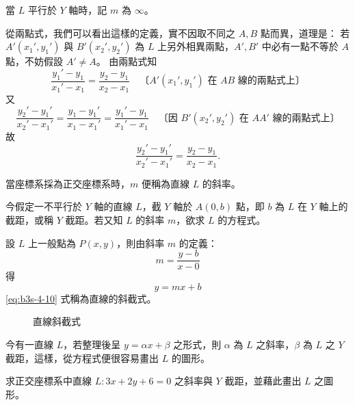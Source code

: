 當 $L$ 平行於 $Y$ 軸時，記 $m$ 為 $\infty$。

從兩點式，我們可以看出這樣的定義，實不因取不同之 $A, B$ 點而異，道理是：
若 $A'(x_1', y_1')$ 與 $B'(x_2', y_2')$ 為 $L$ 上另外相異兩點，$A', B'$ 中必有一點不等於 $A$ 點，不妨假設 $A' \neq A$。
由兩點式知
\[ \frac{y_1' - y_1}{x_1' - x_1} = \frac{y_2 - y_1}{x_2 - x_1} \quad\text{〔$A'(x_1', y_1')$ 在 $AB$ 線的兩點式上〕} \]
又
\[ \frac{y_2' - y_1'}{x_2' - x_1'} = \frac{y_1 - y_1'}{x_1 - x_1'} = \frac{y_1' - y_1}{x_1' - x_1} \quad\text{〔因 $B'(x_2', y_2')$ 在 $AA'$ 線的兩點式上〕} \]
故
\[ \frac{y_2' - y_1'}{x_2' - x_1'} = \frac{y_2 - y_1}{x_2 - x_1}. \]

當座標系採為正交座標系時，$m$ 便稱為直線 $L$ 的斜率。

今假定一不平行於 $Y$ 軸的直線 $L$，截 $Y$ 軸於 $A(0, b)$ 點，即 $b$ 為 $L$ 在 $Y$ 軸上的截距，或稱 $Y$ 截距。若又知 $L$ 的斜率 $m$，欲求 $L$ 的方程式。

設 $L$ 上一般點為 $P(x, y)$，則由斜率 $m$ 的定義：
\[ m = \frac{y - b}{x - 0} \]
得
\begin{equation}
y = mx + b
\label{eq:b3s-4-10}
\end{equation}
\eqref{eq:b3s-4-10} 式稱為直線的斜截式。

\begin{figure}[H]
\centering
{}
\caption{直線斜截式}
\label{fig:4-17}
\end{figure}

今有一直線 $L$，若整理後呈 $y = \alpha x + \beta$ 之形式，則 $\alpha$ 為 $L$ 之斜率，$\beta$ 為 $L$ 之 $Y$ 截距，這樣，從方程式便很容易畫出 $L$ 的圖形。

\begin{example}[例 10]
求正交座標系中直線 $L : 3x + 2y + 6 = 0$ 之斜率與 $Y$ 截距，並藉此畫出 $L$ 之圖形。
\end{example}

